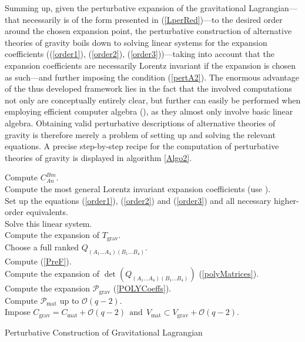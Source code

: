 \documentclass[%
preprint,
titlepage,
nofootinbib,
amsmath,amssymb,
showkeys,
aps,
prd,
floatfix,
]{revtex4-2}
\begin{document}
Summing up, given the perturbative expansion of the gravitational Lagrangian---that necessarily is of the form presented in (\ref{LperRed})---to the desired order around the chosen expansion point, the perturbative construction of alternative theories of gravity boils down to solving linear systems for the expansion coefficients ((\ref{order1}), (\ref{order2}), (\ref{order3}))---taking into account that the expansion coefficients are necessarily Lorentz invariant if the expansion is chosen as such---and further imposing the condition
(\ref{pertA2}). The enormous advantage of the thus developed framework lies in the fact that the involved computations not only are conceptually entirely clear, but further can easily be performed when employing efficient computer algebra (\cite{sparse-tensor}), as they almost only involve basic linear algebra. Obtaining valid perturbative descriptions of alternative theories of gravity is therefore merely a problem of setting up and solving the relevant equations. A precise step-by-step recipe for the computation of perturbative theories of gravity is displayed in algorithm \ref{Algo2}.
\begin{algorithm}[hbt!]
\SetAlgoLined
{}
Compute $C^{Bm}_{An}$. \\
Compute the most general Lorentz invariant expansion coefficients (use \cite{sparse-tensor}).\\
Set up the equations (\ref{order1}), (\ref{order2}) and (\ref{order3}) and all necessary higher-order equivalents.\\
Solve this linear system. \\
Compute the expansion of $T_{\text{grav}}$.\\
Choose a full ranked $Q_{(A_1...A_4)(B_1...B_4)}$. \\
Compute (\ref{PreF}).\\
Compute the expansion of $\operatorname{det}(Q_{(A_1...A_4)(B_1...B_4)})$ (\ref{polyMatrices}). \\
Compute the expansion $\mathcal{P}_{\text{grav}}$ (\ref{POLYCoeffs}). \\
Compute $\mathcal{P}_{\text{mat}}$ up to $\mathcal{O}(q-2)$.\\
Impose $C_{\text{grav}} = C_{\text{mat}} + \mathcal{O}(q-2) \ \ \text{and} \ \ V_{\text{mat}} \subset V_{\text{grav}} + \mathcal{O}(q-2)$.
 \caption{Perturbative Construction of Gravitational Lagrangian}\label{Algo2}
\end{algorithm}
\end{document}
